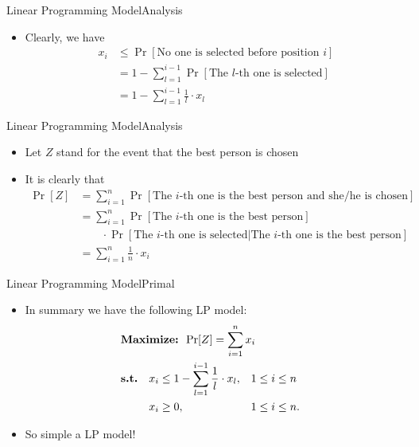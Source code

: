 \documentclass{beamer}
\begin{document}
\begin{frame}{Linear Programming Model}{Analysis}
\begin{itemize}
  \item Clearly, we have 
		  \begin{equation*}
				  \begin{split}
						  x_i &\leq \Pr[\text{No one is selected before position $i$}]\\
						  &=1-\sum_{l = 1}^{i-1}\Pr[\text{The $l$-th one is selected}]\\
						  &=1-\sum_{l = 1}^{i-1}\frac{1}{l}\cdot x_l
				  \end{split}
		  \end{equation*}
\end{itemize}
\end{frame}

\begin{frame}{Linear Programming Model}{Analysis}
\begin{itemize}
\item Let $Z$ stand for the event that the best person is chosen
\item It is clearly that
		\begin{equation}
				\begin{split}
						\Pr[Z] &= \sum_{i = 1}^n \Pr[\text{The $i$-th one is the best person and she/he is chosen}]\\
						&= \sum_{i=1}^n\Pr[\text{The $i$-th one is the best person}]\\
						&\qquad\cdot\Pr[\text{The $i$-th one is selected}|\text{The $i$-th one is the best person}]\\
						&= \sum_{i=1}^n\frac{1}{n}\cdot x_i
				\end{split}
		\end{equation}
\end{itemize}
\end{frame}

\begin{frame}{Linear Programming Model}{Primal}
\begin{itemize}
\item In summary we have the following LP model:
		\begin{equation}
				\begin{split}
						&\text{\bf Maximize: } \Pr[Z] = \sum_{i=1}^n x_i\\
						&\begin{aligned}
								&\text{\bf s.t.}& & x_i \leq 1-\sum_{l = 1}^{i-1}\frac{1}{l}\cdot x_l, & &1\leq i \leq n&\\
								& & &x_i \geq 0, & &1\leq i \leq n.&
						\end{aligned}
				\end{split}
		\end{equation}
\item So simple a LP model!
\end{itemize}
\end{frame}
\end{document}

